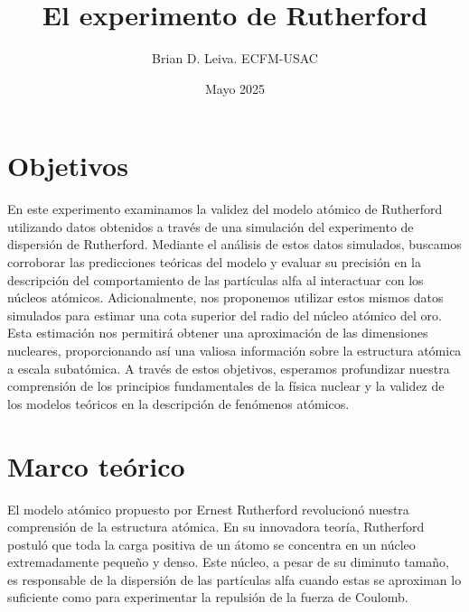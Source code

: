 \documentclass[twocolumn,a4paper,11pt]{scrartcl}
\title{El experimento de Rutherford}
\author{Brian D. Leiva. ECFM-USAC}
\date{Mayo 2025}
\begin{document}

\section{Objetivos}
En este experimento examinamos la validez del modelo atómico de Rutherford utilizando datos obtenidos a través de una simulación del experimento de dispersión de Rutherford. Mediante el análisis de estos datos simulados, buscamos corroborar las predicciones teóricas del modelo y evaluar su precisión en la descripción del comportamiento de las partículas alfa al interactuar con los núcleos atómicos. Adicionalmente, nos proponemos utilizar estos mismos datos simulados para estimar una cota superior del radio del núcleo atómico del oro. Esta estimación nos permitirá obtener una aproximación de las dimensiones nucleares, proporcionando así una valiosa información sobre la estructura atómica a escala subatómica. A través de estos objetivos, esperamos profundizar nuestra comprensión de los principios fundamentales de la física nuclear y la validez de los modelos teóricos en la descripción de fenómenos atómicos.

\section{Marco teórico}
El modelo atómico propuesto por Ernest Rutherford revolucionó nuestra comprensión de la estructura atómica. En su innovadora teoría, Rutherford postuló que toda la carga positiva de un átomo se concentra en un núcleo extremadamente pequeño y denso. Este núcleo, a pesar de su diminuto tamaño, es responsable de la dispersión de las partículas alfa cuando estas se aproximan lo suficiente como para experimentar la repulsión de la fuerza de Coulomb.
\end{document}
